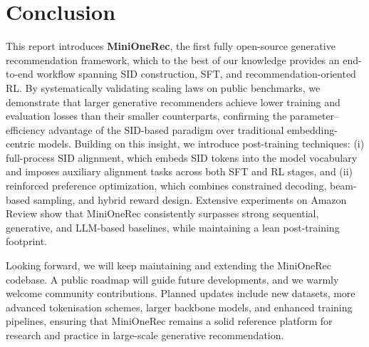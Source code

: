 \section{Conclusion}
\label{conclusion}
This report introduces \textbf{MiniOneRec}, the first fully open-source generative recommendation framework, which to the best of our knowledge provides an end-to-end workflow spanning SID construction, SFT, and recommendation-oriented RL.
By systematically validating scaling laws on public benchmarks, we demonstrate that larger generative recommenders achieve lower training and evaluation losses than their smaller counterparts, confirming the parameter–efficiency advantage of the SID-based paradigm over traditional embedding-centric models.  
Building on this insight, we introduce post-training techniques:  
(i) full-process SID alignment, which embeds SID tokens into the model vocabulary and imposes auxiliary alignment tasks across both SFT and RL stages, and (ii) reinforced preference optimization, which combines constrained decoding, beam-based sampling, and hybrid reward design.  
Extensive experiments on Amazon Review show that MiniOneRec consistently surpasses strong sequential, generative, and LLM-based baselines, while maintaining a lean post-training footprint.

Looking forward, we will keep maintaining and extending the MiniOneRec codebase.  
A public roadmap will guide future developments, and we warmly welcome community contributions.  
Planned updates include new datasets, more advanced tokenisation schemes, larger backbone models, and enhanced training pipelines, ensuring that MiniOneRec remains a solid reference platform for research and practice in large-scale generative recommendation.
